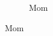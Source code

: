 \documentclass{article}
\begin{document}
\begin{figure}
\begin{subfigure}[b]{0.5\textwidth}
    \caption{Mom}
    \label{fig:2}
  \end{subfigure}

\end{figure}
\end{document}
